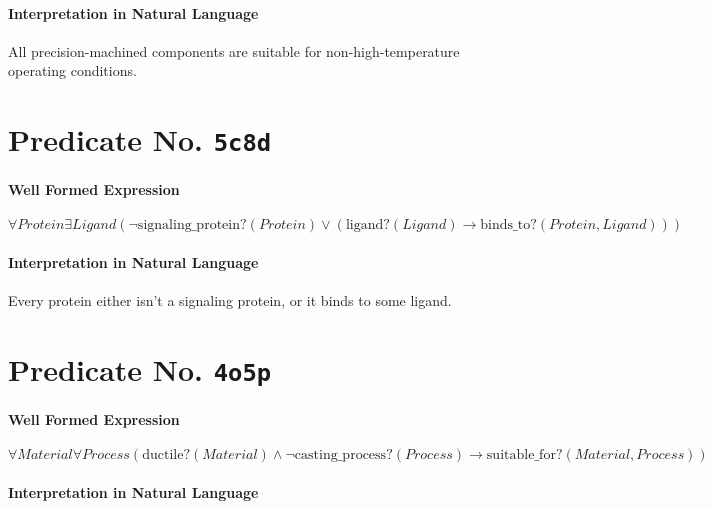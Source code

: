 \documentclass[11pt]{article}
\begin{document}
\paragraph*{Interpretation in Natural Language}
\label{sec:org41824f6}

All precision-machined components are suitable for non-high-temperature operating conditions.



\section{Predicate No. \texttt{5c8d}}
\label{sec:org45af05e}

\paragraph*{Well Formed Expression}
\label{sec:org2555bc7}

\(\forall \mathit{Protein} \exists \mathit{Ligand} (\neg \mathrm{signaling\_protein?}(\mathit{Protein}) \lor (\mathrm{ligand?}(\mathit{Ligand}) \rightarrow \mathrm{binds\_to?}(\mathit{Protein}, \mathit{Ligand})))\)

\paragraph*{Interpretation in Natural Language}
\label{sec:org858018e}

Every protein either isn't a signaling protein, or it binds to some ligand.



\section{Predicate No. \texttt{4o5p}}
\label{sec:orgc9ae528}

\paragraph*{Well Formed Expression}
\label{sec:org1bd779f}

\(\forall \mathit{Material} \forall \mathit{Process} (\mathrm{ductile?}(\mathit{Material}) \land \neg \mathrm{casting\_process?}(\mathit{Process}) \rightarrow \mathrm{suitable\_for?}(\mathit{Material}, \mathit{Process}))\)

\paragraph*{Interpretation in Natural Language}
\label{sec:org1c48ef8}
\end{document}
